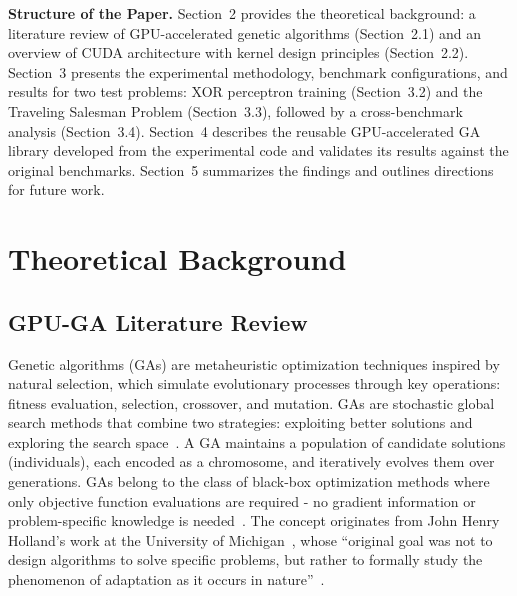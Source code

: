     \bigskip\textbf{Structure of the Paper.} Section~2 provides the theoretical background: a literature review of GPU-accelerated genetic algorithms (Section~2.1) and an overview of CUDA architecture with kernel design principles (Section~2.2). Section~3 presents the experimental methodology, benchmark configurations, and results for two test problems: XOR perceptron training (Section~3.2) and the Traveling Salesman Problem (Section~3.3), followed by a cross-benchmark analysis (Section~3.4). Section~4 describes the reusable GPU-accelerated GA library developed from the experimental code and validates its results against the original benchmarks. Section~5 summarizes the findings and outlines directions for future work.

\newpage

\section{Theoretical Background}

\subsection{GPU-GA Literature Review}




Genetic algorithms (GAs) are metaheuristic optimization techniques inspired by natural selection, which simulate evolutionary processes through key operations: fitness evaluation, selection, crossover, and mutation. GAs are stochastic global search methods that combine two strategies: exploiting better solutions and exploring the search space~\cite{cheng2020parallel}. A GA maintains a population of candidate solutions (individuals), each encoded as a chromosome, and iteratively evolves them over generations. GAs belong to the class of black-box optimization methods where only objective function evaluations are required - no gradient information or problem-specific knowledge is needed~\cite{katoch2021review}. The concept originates from John Henry Holland's work at the University of Michigan~\cite{holland1975adaptation}, whose ``original goal was not to design algorithms to solve specific problems, but rather to formally study the phenomenon of adaptation as it occurs in nature''~\cite{mitchell1998introduction}.

